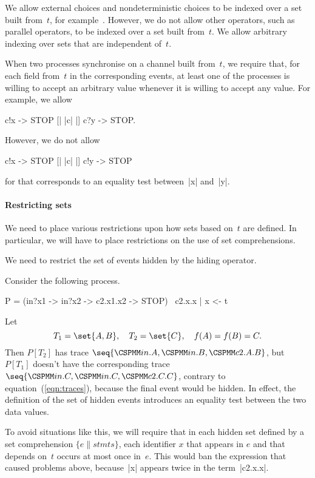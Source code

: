 We allow external choices and nondeterministic choices to be indexed over a
set built from~$t$, for example~.  However, we
do not allow other operators, such as parallel operators, to be indexed over a
set built from~$t$.  We allow arbitrary indexing over sets that are
independent of~$t$. 

When two processes synchronise on a channel built from~$t$, we require that,
for each field from~$t$ in the corresponding events, at least one of the
processes is willing to accept an arbitrary value whenever it is willing to
accept any value.  For example, we allow
\begin{cspm}
c!x -> STOP [| {|c|} |] c?y -> STOP.
\end{cspm}
However, we do not allow 
\begin{cspm}
c!x -> STOP [| {|c|} |] c!y -> STOP
\end{cspm}
for that corresponds to an equality test between~|x| and~|y|. 


\paragraph{Restricting sets}

We need to place various restrictions upon how sets based on~$t$ are defined.
In particular, we will have to place restrictions on the use of set
comprehensions. 

We need to restrict the set of events hidden by the hiding operator.  
%
\begin{example}
Consider the following process.
\begin{cspm}
P = (in?x1 -> in?x2 -> c2.x1.x2 -> STOP) \ {c2.x.x | x <- t}
\end{cspm}
Let
\[
T_1 = \set{A,B}, \quad T_2 = \set{C}, \quad f(A) = f(B) =  C.
\]
Then $P[T_2]$ has trace $\seq{\M{in}.A, \M{in}.B, \M{c2}.A.B}$, but $P[T_1]$
doesn't have the corresponding trace $\seq{\M{in}.C, \M{in}.C, \M{c2}.C.C}$,
contrary to equation~(\ref{eqn:traces}), because the final event would be
hidden.  In effect, the definition of the set of hidden events introduces an
equality test between the two data values.
\end{example}


To avoid situations like this, we will require that in each hidden set defined
by a set comprehension $\{ e \| stmts\}$, each identifier $x$ that appears in
$e$ and that depends on~$t$ occurs at most once in~$e$.  This would ban the
expression  that caused problems above, because~|x|
appears twice in the term~|c2.x.x|.

